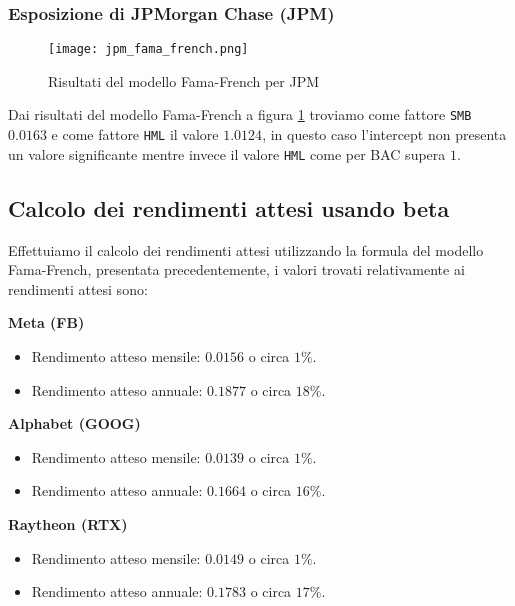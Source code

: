 \pagebreak

\subsubsection{Esposizione di JPMorgan Chase (JPM)}

\begin{figure}[ht]
    \centering
    \texttt{[image: jpm\_fama\_french.png]}
    \caption{Risultati del modello Fama-French per JPM}
    \label{fig:jpm_fama_french}
\end{figure}

Dai risultati del modello Fama-French a figura \ref{fig:jpm_fama_french} troviamo come fattore \verb|SMB| $0.0163$ e come fattore \verb|HML| il valore $1.0124$, 
in questo caso l'intercept non presenta un valore significante mentre invece il valore \verb|HML| come per BAC supera $1$.

\subsection{Calcolo dei rendimenti attesi usando beta}

Effettuiamo il calcolo dei rendimenti attesi utilizzando la formula del modello Fama-French, presentata precedentemente, i valori trovati
relativamente ai rendimenti attesi sono:

\textbf{Meta (FB)}

\begin{itemize}
    \item Rendimento atteso mensile: $0.0156$ o circa $1\%$.
    \item Rendimento atteso annuale: $0.1877$ o circa $18\%$.
\end{itemize}

\textbf{Alphabet (GOOG)}

\begin{itemize}
    \item Rendimento atteso mensile: $0.0139$ o circa $1\%$.
    \item Rendimento atteso annuale: $0.1664$ o circa $16\%$.
\end{itemize}

\textbf{Raytheon (RTX)}

\begin{itemize}
    \item Rendimento atteso mensile: $0.0149$ o circa $1\%$.
    \item Rendimento atteso annuale: $0.1783$ o circa $17\%$.
\end{itemize}

